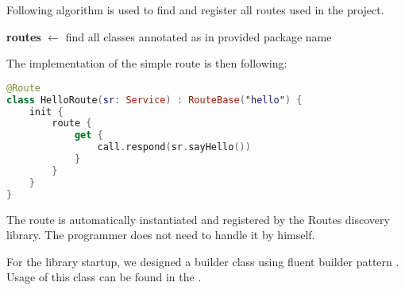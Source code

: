 \medskip \noindent
Following algorithm is used to find and register all routes used in the project.

\begin{algorithm}[H]
    \SetAlgoLined
    \textbf{routes} $\leftarrow$ find all classes annotated as  in provided package name\;
\end{algorithm} 
\medskip \noindent
The implementation of the simple route is then following:

\medskip
\begin{samepage}
\begin{lstlisting}[language=Kotlin]
@Route
class HelloRoute(sr: Service) : RouteBase("hello") {
    init {
        route {
            get {
                call.respond(sr.sayHello())
            }
        }
    }
}
\end{lstlisting}
\end{samepage}

\medskip \noindent
The route is automatically instantiated and registered by the Routes discovery library.
The programmer does not need to handle it by himself.

For the library startup, we designed a builder class using fluent builder pattern .
Usage of this class can be found in the .